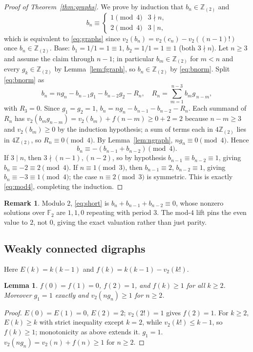 \documentclass[11pt]{article}
\newtheorem{lemma}[theorem]{Lemma}
\theoremstyle{definition}
\newtheorem{remark}[theorem]{Remark}
\begin{document}
\begin{proof}[Proof of Theorem~\ref{thm:graphs}]
We prove by induction that $b_n \in \mathbb{Z}_{(2)}$ and
\begin{equation}\label{eq:mod4}
b_n \equiv \begin{cases} 1 \pmod 4 & 3 \nmid n, \\ 2 \pmod 4 & 3 \mid n,\end{cases}
\end{equation}
which is equivalent to \eqref{eq:graphs} since
$v_2(b_n) = v_2(c_n)-v_2((n-1)!)$ once $b_n \in \mathbb{Z}_{(2)}$.
Base: $b_1 = 1/1 = 1 \equiv 1$, $b_2 = 1/1 = 1 \equiv 1$ (both $3\nmid n$).
Let $n \ge 3$ and assume the claim through $n-1$; in particular
$b_m \in \mathbb{Z}_{(2)}$ for $m < n$ and every $g_k \in \mathbb{Z}_{(2)}$
by Lemma~\ref{lem:fgraph}, so $b_n \in \mathbb{Z}_{(2)}$ by \eqref{eq:bnorm}.
Split \eqref{eq:bnorm} as
\[
b_n = ng_n - b_{n-1}g_1 - b_{n-2}g_2 - R_n,
\quad R_n = \sum_{m=1}^{n-3} b_m g_{\,n-m},
\]
with $R_3 = 0$. Since $g_1=g_2=1$,
$b_n = ng_n - b_{n-1} - b_{n-2} - R_n$.
Each summand of $R_n$ has
$v_2(b_m g_{n-m}) = v_2(b_m) + f(n-m) \ge 0 + 2 = 2$ because
$n-m \ge 3$ and $v_2(b_m) \ge 0$ by the induction hypothesis; a sum of
terms each in $4\mathbb{Z}_{(2)}$ lies in $4\mathbb{Z}_{(2)}$, so
$R_n \equiv 0 \pmod 4$. By Lemma~\ref{lem:ngraph}, $ng_n \equiv 0 \pmod 4$.
Hence
\begin{equation}\label{eq:short}
b_n \equiv -(b_{n-1}+b_{n-2}) \pmod 4.
\end{equation}
If $3 \mid n$, then $3 \nmid (n-1), (n-2)$, so by hypothesis
$b_{n-1} \equiv b_{n-2} \equiv 1$, giving $b_n \equiv -2 \equiv 2 \pmod 4$.
If $n \equiv 1 \pmod 3$, then $b_{n-1} \equiv 2$, $b_{n-2} \equiv 1$,
giving $b_n \equiv -3 \equiv 1 \pmod 4$; the case $n \equiv 2 \pmod 3$
is symmetric. This is exactly \eqref{eq:mod4}, completing the induction.
\end{proof}

\begin{remark}
Modulo $2$, \eqref{eq:short} is $b_n+b_{n-1}+b_{n-2}\equiv 0$, whose
nonzero solutions over $\mathbb{F}_2$ are $1,1,0$ repeating with period
$3$. The mod-$4$ lift pins the even value to $2$, not $0$, giving the
exact valuation rather than just parity.
\end{remark}

\subsection{Weakly connected digraphs}
Here $E(k)=k(k-1)$ and $f(k)=k(k-1)-v_2(k!)$.
\begin{lemma}\label{lem:fdig}
$f(0)=f(1)=0$, $f(2)=1$, and $f(k) \ge 1$ for all $k \ge 2$.
Moreover $g_1 = 1$ exactly and $v_2(ng_n) \ge 1$ for $n \ge 2$.
\end{lemma}
\begin{proof}
$E(0)=E(1)=0$, $E(2)=2$; $v_2(2!)=1$ gives $f(2)=1$.
For $k \ge 2$, $E(k) \ge k$ with strict inequality except $k=2$,
while $v_2(k!) \le k-1$, so $f(k) \ge 1$; monotonicity as above extends
it. $g_1 = 1$. $v_2(ng_n)=v_2(n)+f(n)\ge 1$ for $n\ge 2$.
\end{proof}
\end{document}
